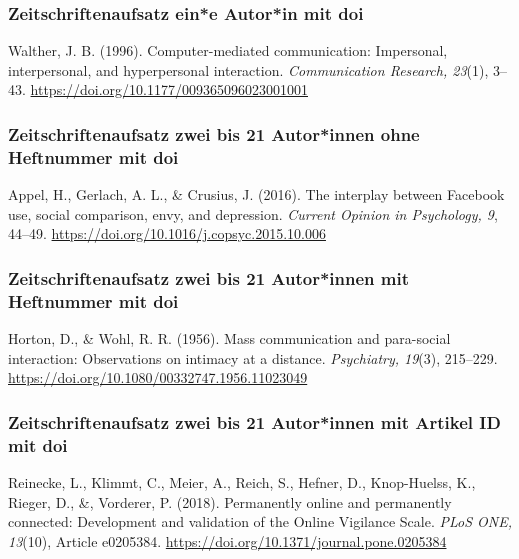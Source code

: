 \documentclass[
  letterpaper,
  DIV=11]{scrreprt}
\begin{document}
\hypertarget{zeitschriftenaufsatz-eine-autorin-mit-doi}{%
\subsubsection{Zeitschriftenaufsatz \textbar{} ein*e Autor*in \textbar{}
mit doi}\label{zeitschriftenaufsatz-eine-autorin-mit-doi}}

Walther, J. B. (1996). Computer-mediated communication: Impersonal,
interpersonal, and hyperpersonal interaction. \emph{Communication
Research, 23}(1), 3--43.
\url{https://doi.org/10.1177/009365096023001001}

\hypertarget{zeitschriftenaufsatz-zwei-bis-21-autorinnen-ohne-heftnummer-mit-doi}{%
\subsubsection{Zeitschriftenaufsatz \textbar{} zwei bis 21 Autor*innen
\textbar{} ohne Heftnummer \textbar{} mit
doi}\label{zeitschriftenaufsatz-zwei-bis-21-autorinnen-ohne-heftnummer-mit-doi}}

Appel, H., Gerlach, A. L., \& Crusius, J. (2016). The interplay between
Facebook use, social comparison, envy, and depression. \emph{Current
Opinion in Psychology, 9}, 44--49.
\url{https://doi.org/10.1016/j.copsyc.2015.10.006}

\hypertarget{zeitschriftenaufsatz-zwei-bis-21-autorinnen-mit-heftnummer-mit-doi}{%
\subsubsection{Zeitschriftenaufsatz \textbar{} zwei bis 21 Autor*innen
\textbar{} mit Heftnummer \textbar{} mit
doi}\label{zeitschriftenaufsatz-zwei-bis-21-autorinnen-mit-heftnummer-mit-doi}}

Horton, D., \& Wohl, R. R. (1956). Mass communication and para-social
interaction: Observations on intimacy at a distance. \emph{Psychiatry,
19}(3), 215--229. \url{https://doi.org/10.1080/00332747.1956.11023049}

\hypertarget{zeitschriftenaufsatz-zwei-bis-21-autorinnen-mit-artikel-id-mit-doi}{%
\subsubsection{Zeitschriftenaufsatz \textbar{} zwei bis 21 Autor*innen
\textbar{} mit Artikel ID \textbar{} mit
doi}\label{zeitschriftenaufsatz-zwei-bis-21-autorinnen-mit-artikel-id-mit-doi}}

Reinecke, L., Klimmt, C., Meier, A., Reich, S., Hefner, D., Knop-Huelss,
K., Rieger, D., \&, Vorderer, P. (2018). Permanently online and
permanently connected: Development and validation of the Online
Vigilance Scale. \emph{PLoS ONE, 13}(10), Article e0205384.
\url{https://doi.org/10.1371/journal.pone.0205384}
\end{document}
